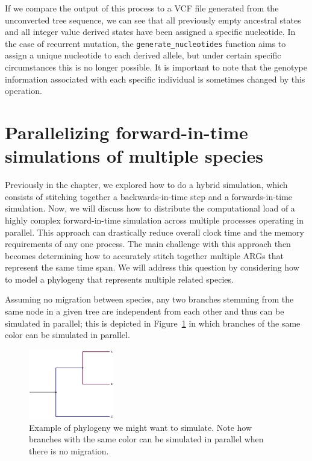 \documentclass[12pt]{article}
\begin{document}
If we compare the output of this process to a VCF file generated from the unconverted tree sequence, we can see that all previously empty ancestral states and
all integer value derived states have been assigned a specific nucleotide. In the case of recurrent mutation, the \verb|generate_nucleotides| function aims to assign a unique
nucleotide to each derived allele, but
under certain specific circumstances
this is no longer possible. It is important to note that the genotype information associated with each specific individual is
sometimes changed
by this operation.

\section*{Parallelizing forward-in-time simulations of multiple species}

Previously in the chapter, we explored how to do a hybrid simulation, which consists of stitching together a backwards-in-time step and a forwards-in-time simulation.
Now, we will discuss how to distribute the computational load of a highly complex forward-in-time simulation across multiple processes operating in parallel.
This approach can drastically reduce overall clock time and the memory requirements of any one process. The main challenge with this approach then becomes
determining how to accurately stitch together multiple ARGs that represent the same time span. We will address this question by considering how to model a phylogeny
that represents multiple related species.

Assuming no migration between species, any two branches stemming from the same node in a given tree are independent from each other and
thus can be simulated in parallel; this is depicted in Figure~\ref{fig:phylo} in which branches of the same color can be simulated in parallel.

\begin{figure}[h!]
    \centering
     \includegraphics[width=0.33\textwidth]{./code/parallelizing_phylogeny/phylo.pdf}
     \caption{Example of phylogeny we might want to simulate. Note how branches with the same color can be simulated in parallel when there is no migration.}
     \label{fig:phylo}
\end{figure}
\end{document}
